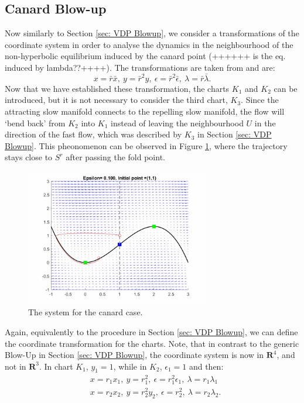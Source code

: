 \subsection{Canard Blow-up}
Now similarly to Section \ref{sec: VDP Blowup}, we consider a transformations of the coordinate system in order to analyse the dynamics in the neighbourhood of the non-hyperbolic equilibrium induced by the canard point (++++++ is the eq. induced by lambda??++++). The transformations are taken from \citep{krupa2001} and are:
\begin{equation}
x=\bar{r}\bar{x}, \ y=\bar{r}^2y, \ \epsilon=\bar{r}^2\bar{\epsilon}, \ \lambda=\bar{r}\bar{\lambda}.
\end{equation}
Now that we have established these transformation, the charts $K_1$ and $K_2$ can be introduced,  but it is not necessary to consider the third chart, $K_3$. Since the attracting slow manifold connects to the repelling slow manifold, the flow will `bend back' from $K_2$ into $K_1$ instead of leaving the neighbourhood $U$ in the direction of the fast flow, which was described by $K_3$ in Section \ref{sec: VDP Blowup}. 
This pheonomenon can be observed in Figure \ref{fig: flow in canard}, where the trajectory stays close to $S^r$ after passing the fold point.
\begin{figure}[h!]
	\centering
\includegraphics[width=8cm, height=6cm]{Images/vdPhopf-Moment-bendback}
	\caption{The \vdp system for the canard case.}
	\label{fig: flow in canard}
\end{figure}\newpage
Again, equivalently to the procedure in Section \ref{sec: VDP Blowup}, we can define the coordinate transformation for the charts. Note, that in contrast to the generic Blow-Up in Section \ref{sec: VDP Blowup}, the coordinate system is now in $\mathbf{R}^4$, and not in $\mathbf{R}^3$. In chart $K_1$, $y_1=1$, while in $K_2$, $\epsilon_1=1$ and then:
\begin{subequations}
	\begin{align}
	&x=r_1x_1, \ y=r_1^2, \ \epsilon=r_1^2\epsilon_1, \ \lambda=r_1\lambda_1 \label{eq: coordiante K1}\\ 
	&x=r_2x_2, \ y=r_2^2y_2, \ \epsilon=r^2_2, \ \lambda=r_2\lambda_2 \label{eq: coordinate K2}.
	\end{align}
\end{subequations}
